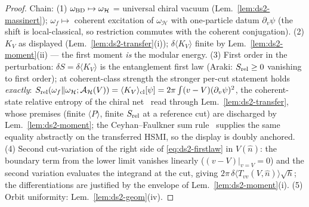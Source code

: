 \begin{proof}
Chain: (1) $\omega_{\rm BD}\mapsto\omega_{\mathcal H}$ =
universal chiral vacuum (Lem.~\ref{lem:ds2-massinert});
$\omega_f\mapsto$ coherent excitation of $\omega_{\mathcal H}$ with
one-particle datum $\partial_v\psi$ (the shift is local-classical,
so restriction commutes with the coherent conjugation). (2) $K_V$ as
displayed (Lem.~\ref{lem:ds2-transfer}(i)); $\delta\langle
K_V\rangle$ finite by Lem.~\ref{lem:ds2-moment}(ii) --- the first
moment \emph{is} the modular energy. (3) First order in the
perturbation: $\delta S=\delta\langle K_V\rangle$ is the
entanglement first law (Araki: $S_{\rm rel}\ge0$ vanishing to first
order); at coherent-class strength the stronger per-cut statement
holds \emph{exactly}: $S_{\rm rel}(\omega_f\Vert\omega_{\mathcal
H};\mathcal A_{\mathcal H}(V))=\langle K_V\rangle_{\rm
cl}[\psi]=2\pi\int(v-V)(\partial_v\psi)^2$, the
coherent-state relative entropy of the chiral
net~\cite{Longo2019coherent} read through
Lem.~\ref{lem:ds2-transfer}, whose premises (finite $\langle
P\rangle$, finite $S_{\rm rel}$ at a reference cut) are discharged
by Lem.~\ref{lem:ds2-moment}; the Ceyhan--Faulkner sum
rule~\cite{CeyhanFaulkner2018} supplies the same equality
abstractly on the transferred HSMI, so the display is doubly
anchored. (4) Second cut-variation of the right side of
\eqref{eq:ds2-firstlaw} in $V(\hat n)$: the boundary term from the
lower limit vanishes linearly ($(v-V)|_{v=V}=0$) and the second
variation evaluates the integrand at the cut, giving
$2\pi\,\delta\langle T_{vv}(V,\hat n)\rangle\sqrt h$; the
differentiations are justified by the envelope of
Lem.~\ref{lem:ds2-moment}(i). (5) Orbit uniformity:
Lem.~\ref{lem:ds2-geom}(iv). \end{proof}

